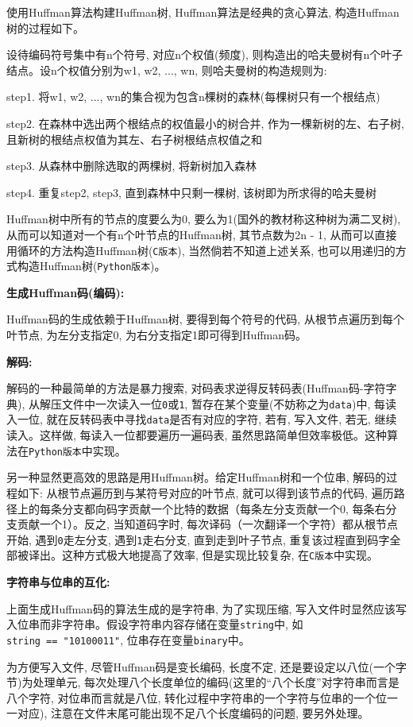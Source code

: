 \documentclass{ctexart}
\begin{document}
使用Huffman算法构建Huffman树, Huffman算法是经典的贪心算法, 构造Huffman树的过程如下。

设待编码符号集中有n个符号, 对应n个权值(频度), 则构造出的哈夫曼树有n个叶子结点。设n个权值分别为w1, w2, ..., wn, 则哈夫曼树的构造规则为:

step1. 将w1, w2, ..., wn的集合视为包含n棵树的森林(每棵树只有一个根结点)

step2. 在森林中选出两个根结点的权值最小的树合并, 作为一棵新树的左、右子树, 且新树的根结点权值为其左、右子树根结点权值之和

step3. 从森林中删除选取的两棵树, 将新树加入森林

step4. 重复step2, step3, 直到森林中只剩一棵树, 该树即为所求得的哈夫曼树

Huffman树中所有的节点的度要么为0, 要么为1(国外的教材称这种树为满二叉树), 从而可以知道对一个有n个叶节点的Huffman树, 其节点数为2n - 1, 从而可以直接用循环的方法构造Huffman树(\texttt{C版本}),
当然倘若不知道上述关系, 也可以用递归的方式构造Huffman树(\texttt{Python版本})。

\textbf{生成Huffman码(编码):}

Huffman码的生成依赖于Huffman树, 要得到每个符号的代码, 从根节点遍历到每个叶节点, 为左分支指定0,
为右分支指定1即可得到Huffman码。

\textbf{解码:}

解码的一种最简单的方法是暴力搜索, 对码表求逆得反转码表(Huffman码-字符字典), 从解压文件中一次读入一位\texttt{0}或\texttt{1}, 暂存在某个变量(不妨称之为\texttt{data})中, 每读入一位, 就在反转码表中寻找\texttt{data}是否有对应的字符, 若有, 写入文件, 若无, 继续读入。这样做, 每读入一位都要遍历一遍码表, 虽然思路简单但效率极低。这种算法在\texttt{Python版本}中实现。

另一种显然更高效的思路是用Huffman树。给定Huffman树和一个位串, 解码的过程如下: 从根节点遍历到与某符号对应的叶节点, 就可以得到该节点的代码, 遍历路径上的每条分支都向码字贡献一个比特的数据（每条左分支贡献一个0, 每条右分支贡献一个1）。反之, 当知道码字时, 每次译码（一次翻译一个字符）都从根节点开始, 遇到\texttt{0}走左分支, 遇到\texttt{1}走右分支, 直到走到叶子节点, 重复该过程直到码字全部被译出。这种方式极大地提高了效率, 但是实现比较复杂, 在\texttt{C版本}中实现。

\textbf{字符串与位串的互化:}

上面生成Huffman码的算法生成的是字符串, 为了实现压缩, 写入文件时显然应该写入位串而非字符串。假设字符串内容存储在变量\texttt{string}中, 如\texttt{string\ ==\ "10100011"}, 位串存在变量\texttt{binary}中。

为方便写入文件, 尽管Huffman码是变长编码, 长度不定, 还是要设定以八位(一个字节)为处理单元, 每次处理八个长度单位的编码(这里的“八个长度”对字符串而言是八个字符, 对位串而言就是八位, 转化过程中字符串的一个字符与位串的一个位一一对应), 注意在文件末尾可能出现不足八个长度编码的问题, 要另外处理。
\end{document}
